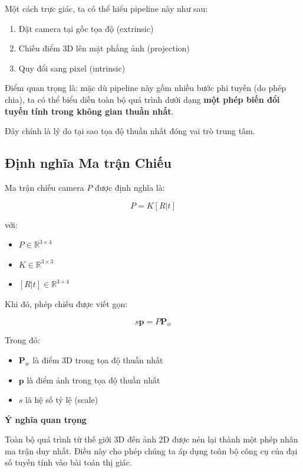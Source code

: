 Một cách trực giác, ta có thể hiểu pipeline này như sau:
\begin{enumerate}
	\item Đặt camera tại gốc tọa độ (extrinsic)
	\item Chiếu điểm 3D lên mặt phẳng ảnh (projection)
	\item Quy đổi sang pixel (intrinsic)
\end{enumerate}

Điểm quan trọng là: mặc dù pipeline này gồm nhiều bước phi tuyến (do phép chia), ta có thể biểu diễn toàn bộ quá trình dưới dạng \textbf{một phép biến đổi tuyến tính trong không gian thuần nhất}.

Đây chính là lý do tại sao tọa độ thuần nhất đóng vai trò trung tâm.

\subsection{Định nghĩa Ma trận Chiếu}
\label{subsec:projection_definition}

Ma trận chiếu camera $P$ được định nghĩa là:

\[
P = K [R | t]
\]

với:
\begin{itemize}
	\item $P \in \mathbb{R}^{3 \times 4}$
	\item $K \in \mathbb{R}^{3 \times 3}$
	\item $[R|t] \in \mathbb{R}^{3 \times 4}$
\end{itemize}

Khi đó, phép chiếu được viết gọn:

\[
s \mathbf{p} = P \mathbf{P}_w
\]

Trong đó:
\begin{itemize}
	\item $\mathbf{P}_w$ là điểm 3D trong tọa độ thuần nhất
	\item $\mathbf{p}$ là điểm ảnh trong tọa độ thuần nhất
	\item $s$ là hệ số tỷ lệ (scale)
\end{itemize}

\begin{mdframed}[style=infobox]
	\textbf{Ý nghĩa quan trọng}
	
	Toàn bộ quá trình từ thế giới 3D đến ảnh 2D được nén lại thành một phép nhân ma trận duy nhất. Điều này cho phép chúng ta áp dụng toàn bộ công cụ của đại số tuyến tính vào bài toán thị giác.
\end{mdframed}

